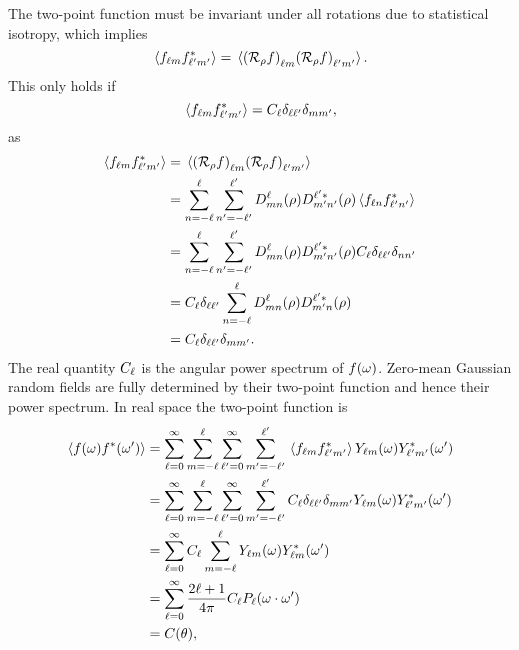 The two-point function must be invariant under all rotations due to statistical isotropy, which implies
%
\begin{equation}
	\expval*{\harmonic{f} \conj{\harmonic[']{f}}}
	= \expval*{\harmonic{(\rotation{\rho}f)}\harmonic[']{(\rotation{\rho}f)}}.
\end{equation}
%
This only holds if
%
\begin{equation}
	\expval*{\harmonic{f} \conj{\harmonic[']{f}}}
	= \powerSpectrum \delta_{\ell\ell'} \delta_{m m'},
\end{equation}
%
as
%
\begin{align}
	\expval*{\harmonic{f} \conj{\harmonic[']{f}}}
	 & = \expval*{\harmonic{(\rotation{\rho}f)}\harmonic[']{(\rotation{\rho}f)}} \nonumber{}                                                                \\
	 & = \wignerSum \wignerSum['] \wigner{\ell}{m}{n}(\rho) \wigner[\ast]{\ell'}{m'}{n'}(\rho) \expval*{f_{\ell n} \conj{f_{\ell' n'}}} \nonumber{}         \\
	 & = \wignerSum \wignerSum['] \wigner{\ell}{m}{n}(\rho) \wigner[\ast]{\ell'}{m'}{n'}(\rho) \powerSpectrum \delta_{\ell \ell'} \delta_{n n'} \nonumber{} \\
	 & = \powerSpectrum \delta_{\ell\ell'} \wignerSum \wigner{\ell}{m}{n}(\rho) \wigner[\ast]{\ell'}{m'}{n}(\rho) \nonumber{}                               \\
	 & = \powerSpectrum \delta_{\ell\ell'} \delta_{m m'}.
\end{align}
%
The real quantity \(\powerSpectrum{}\) is the angular power spectrum of \(\pixel{f}\).
Zero-mean Gaussian random fields are fully determined by their two-point function and hence their power spectrum.
In real space the two-point function is
%
\begin{align}
	\expval*{f(\omega) \conj{f}(\omega')}
	 & = \sum\limits_{\ell=0}^{\infty} \sum\limits_{m=-\ell}^{\ell} \sum\limits_{\ell'=0}^{\infty} \sum\limits_{m'=-\ell'}^{\ell'} \expval*{\harmonic{f} \conj{\harmonic[']{f}}} \harmonic{Y}(\omega) \conj{\harmonic[']{Y}}(\omega') \nonumber{}   \\
	 & = \sum\limits_{\ell=0}^{\infty} \sum\limits_{m=-\ell}^{\ell} \sum\limits_{\ell'=0}^{\infty} \sum\limits_{m'=-\ell'}^{\ell'} \powerSpectrum \delta_{\ell\ell'} \delta_{m m'} \harmonic{Y}(\omega) \conj{\harmonic[']{Y}}(\omega') \nonumber{} \\
	 & = \sum\limits_{\ell=0}^{\infty} \powerSpectrum \sum\limits_{m=-\ell}^{\ell} \harmonic{Y}(\omega) \conj{\harmonic{Y}}(\omega') \nonumber{}                                                                                                    \\
	 & = \sum\limits_{\ell=0}^{\infty} \factor \powerSpectrum P_{\ell}(\omega\cdot\omega')  \nonumber{}                                                                                                                                             \\
	 & = C(\theta),
\end{align}
